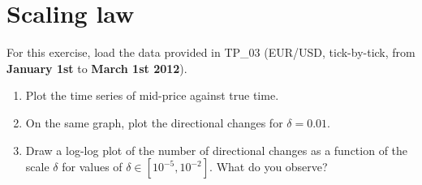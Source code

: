 \section{Scaling law}
For this exercise, load the data provided in TP\_03 (EUR/USD, tick-by-tick, from \textbf{January 1st} to \textbf{March 1st 2012}). 

\begin{enumerate}
    \item Plot the time series of mid-price against true time. 
    \item On the same graph, plot the directional changes for $\delta = 0.01$.
    \item Draw a log-log plot of the number of directional changes as a function of the scale $\delta$ for values of  $\delta \in [10^{-5}, 10^{-2}]$. What do you observe? 
\end{enumerate}